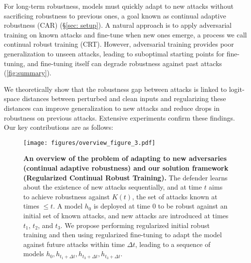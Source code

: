 For long-term robustness, models must quickly adapt to new attacks without sacrificing robustness to previous ones, a goal known as continual adaptive robustness (CAR) \citep{dai2024position} (\S \ref{sec: setup}). A natural approach is to apply adversarial training on known attacks and fine-tune when new ones emerge, a process we call continual robust training (CRT). However, adversarial training provides poor generalization to unseen attacks, leading to suboptimal starting points for fine-tuning, and fine-tuning itself can degrade robustness against past attacks (\cref{fig:summary}).

We theoretically show that the robustness gap between attacks is linked to logit-space distances between perturbed and clean inputs and regularizing these distances can improve generalization to new attacks and reduce drops in robustness on previous attacks. Extensive experiments confirm these findings. Our key contributions are as follows:

\begin{figure*}[!t]
	\centering
	\texttt{[image: figures/overview\_figure\_3.pdf]}
	\caption{\textbf{An overview of the problem of adapting to new adversaries (continual adaptive robustness) and our solution framework (Regularized Continual Robust Training).} The defender learns about the existence of new attacks sequentially, and at time $t$ aims to achieve robustness against $K(t)$, the set of attacks known at times $\le t$.  A model $h_0$ is deployed at time $0$ to be robust against an initial set of known attacks, and new attacks are introduced at times $t_1$, $t_2$, and $t_3$. We propose performing regularized initial robust training  and then using regularized fine-tuning to adapt the model against future attacks within time $\Delta t$, leading to a sequence of models $h_0, h_{t_1 + \Delta t}, h_{t_3 + \Delta t}, h_{t_3 + \Delta t}$.}
	\label{fig:overview}
	\vspace{-10pt}
\end{figure*}


